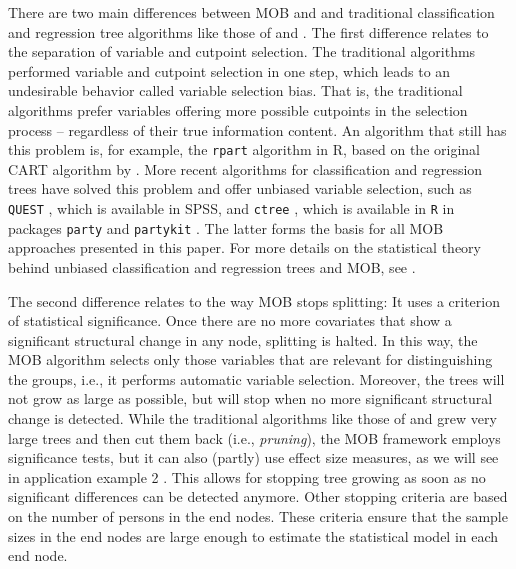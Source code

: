 \documentclass[doc,floatsintext,natbib]{apa7}
\begin{document}
There are two main differences between MOB and and traditional classification and regression tree algorithms like those of \citet{Breetal:1984} and \citet{Qui:1993}. The first difference relates to the separation of variable and cutpoint selection. The traditional algorithms performed variable and cutpoint selection in one step, which leads to an undesirable behavior called variable selection bias. That is, the traditional algorithms prefer variables offering more possible cutpoints in the selection process -- regardless of their true information content. An algorithm that still has this problem is, for example, the \texttt{rpart} algorithm in R, based on the original CART algorithm by \citet{Breetal:1984}. More recent algorithms for classification and regression trees have solved this problem and offer unbiased variable selection, such as \texttt{QUEST} \citep{LohShi:1997}, which is available in SPSS, and \texttt{ctree} \citep{Hotetal:2006}, which is available in \texttt{R} in packages \texttt{party} and \texttt{partykit} \citep{partykit:pkg}. The latter forms the basis for all MOB approaches presented in this paper. For more details on the statistical theory behind unbiased classification and regression trees and MOB, see \citet{Hotetal:2006,StrMalTut:2009:PM,StroyKopf15}.  

The second difference relates to the way MOB stops splitting: It uses a criterion of statistical significance. Once there are no more covariates that show a significant structural change in any node, splitting is halted. In this way, the MOB algorithm selects only those variables that are relevant for distinguishing the groups, i.e., it performs automatic variable selection. Moreover, the trees will not grow as large as possible, but will stop when no more significant structural change is detected. While the traditional algorithms like those of \citet{Breetal:1984} and \citet{Qui:1993} grew very large trees and then cut them back (i.e., \textit{pruning}), the MOB framework employs significance tests, but it can also (partly) use effect size measures, as we will see in application example 2 . This allows for stopping tree growing as soon as no significant differences can be detected anymore. Other stopping criteria are based on the number of persons in the end nodes. These criteria ensure that the sample sizes in the end nodes are large enough to estimate the statistical model in each end node.
\end{document}
